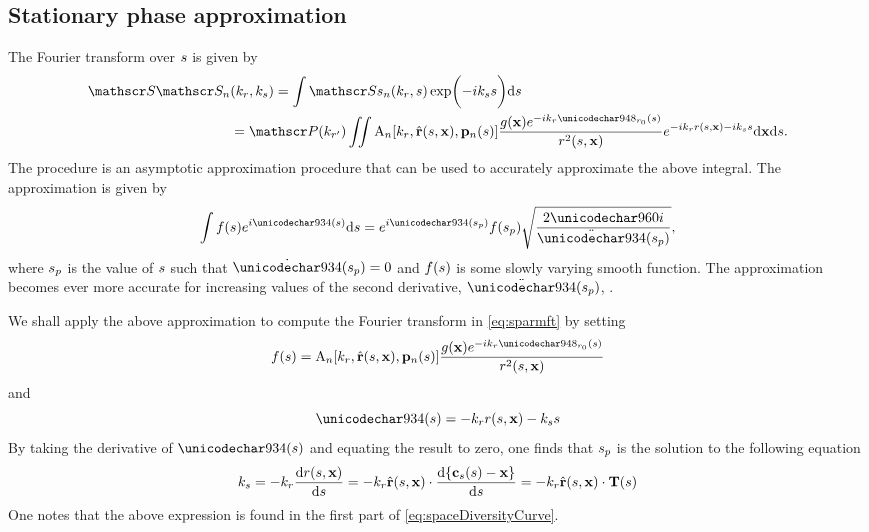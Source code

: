 \subsection{Stationary phase approximation}
The Fourier transform over $s$ is given by
\begin{equation}
\begin{split}
 \SkSk{\channelIndex}&(\kr,\kparm)=\int\Skst{\channelIndex}(\kr,\parm)\Ex{-\im\kparm\parm}\d\parm\\
 &=\Snvelope(\krc)\iint \pattern{\channelIndex}[\kr,\uRangeVector{\parm, \targetnoparm}, \pAntennaParm{\channelIndex}]\frac{\reflectivity(\targetnoparm)\eex{-\im\kr\rangeErrorZero(\parm)}}{\amplitude\range^2(\parm, \targetnoparm)}\eex{-\im\kr\amplitude\range(\parm, \targetnoparm) - \im\kparm\parm}\d\targetnoparm\d\parm.
 \end{split}
 \label{eq:sparmft}
\end{equation}
The  procedure is an asymptotic approximation procedure that can be used to accurately approximate the above integral. The approximation is given by
\begin{equation}
 \int f(\parm)\eex{\im\Phi(\parm)}\d \parm = \eex{\im\Phi(\stationaryparm)}f(\stationaryparm)\sqrt{\frac{2\pi\im}{\ddot\Phi(\stationaryparm)}},
 \label{eq:stationaryphasedefinition}
\end{equation}
where $s_p$ is the value of $s$ such that $\dot{\Phi}(\stationaryparm)=0$ and $f(s)$ is some slowly varying smooth function.
The approximation becomes ever more accurate for increasing values of the second derivative, $\ddot\Phi(\stationaryparm)$, \cite{Spiegel1964}. 
\par
We shall apply the above approximation to compute the Fourier transform in \eqref{eq:sparmft} by setting
\begin{equation}
 f(\parm) = \pattern{\channelIndex}[\kr, \uRangeVectorParm, \pAntennaParm{\channelIndex}]\frac{\reflectivity(\vct\target)\eex{-\im\kr\rangeErrorZero(\parm)}}{\amplitude\range^2(\parm, \targetnoparm)}
\end{equation}
and
\begin{equation}
 \Phi(\parm) = -\kr\amplitude\range(\parm, \targetnoparm) - \kparm\parm
 \label{eq:generalphase}
\end{equation}
By taking the derivative of $\Phi(\parm)$ and equating the result to zero, one finds that $s_p$ is the solution to the following equation
\begin{equation}
 \kparm = -\kr\frac{\d\amplitude\range(\parm, \targetnoparm)}{\d\parm} = -\kr\uRangeVectorParm\cdot\frac{\d\{\sats(\parm) - \target\}}{\d\parm} = -\kr\uRangeVectorParm\cdot\vct{T}(\parm)
 \label{eq:kparmangle}
\end{equation}
One notes that the above expression is found in the first part of \eqref{eq:spaceDiversityCurve}.
